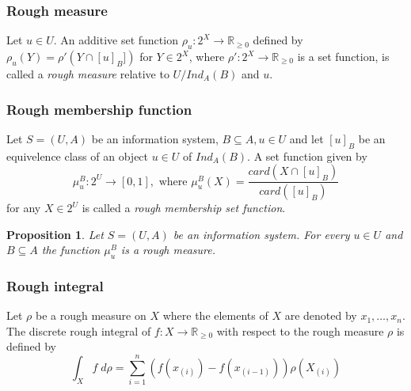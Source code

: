 \documentclass[envcountsect]{beamer}
\newtheorem{proposition}[theorem]{Proposition}
\begin{document}
\begin{frame}

\frametitle{Rough measure}

\begin{definition}
	Let $u \in U$. An additive set function $\rho_u : 2^X \rightarrow \mathbb{R}_{\geq 0}$ defined by $\rho_u(Y) = \rho'(Y\cap [u]_B])$ for $Y \in 2^X$, where $\rho' : 2^X \rightarrow \mathbb{R}_{\geq0}$ is a set function, is called a \emph{rough measure} relative to $U/Ind_A(B)$ and $u$.
\end{definition}

\end{frame}

\begin{frame}
\frametitle{Rough membership function}

\begin{definition}
	Let $S=(U,A)$ be an information system, $B \subseteq A, u \in U$ and let $[u]_B$ be an equivelence class of an object $u \in U$ of $Ind_A(B)$. A set function given by 
	$$
	\mu_u^B : 2^U \rightarrow [0,1], \text{ where } \mu_u^B (X) = \frac{card(X \cap [u]_B)}{card([u]_B)}
	$$
for any $X \in 2^U$ is called a \emph{rough membership set function}.
\end{definition}

\begin{proposition}
Let $S=(U,A)$ be an information system. For every $u \in U$ and $B \subseteq A$ the function $\mu_u^B$ is a rough measure.

\end{proposition}
\end{frame}

\begin{frame}
\frametitle{Rough integral}

\begin{definition}
	Let $\rho$ be a rough measure on $X$ where the elements of $X$ are denoted by $x_1,\dots,x_n$. The discrete rough integral of $f : X \rightarrow \mathbb{R}_{\geq 0}$ with respect to the rough measure $\rho$ is defined by
	$$
	\int_X f \; d\rho = \sum_{i=1}^n (f(x_{(i)})- f(x_{(i-1)}))\rho(X_{(i)})
	$$

\end{definition}

\end{frame}
\end{document}
